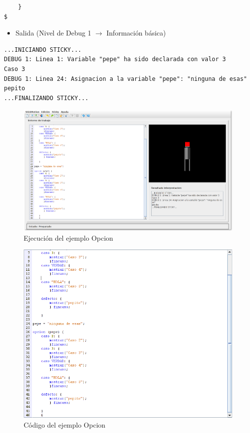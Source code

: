 \documentclass[a4paper, 12pt]{book}
\begin{document}
\begin{itemize}
\begin{verbatim}
    }
$
\end{verbatim}
  
  
  
  \begin{itemize}
\item Salida (Nivel de Debug 1 $\rightarrow$ Información básica)
\end{itemize}
\begin{verbatim}
...INICIANDO STICKY...
DEBUG 1: Linea 1: Variable "pepe" ha sido declarada con valor 3
Caso 3
DEBUG 1: Linea 24: Asignacion a la variable "pepe": "ninguna de esas"
pepito
...FINALIZANDO STICKY...
\end{verbatim}




\begin{figure}[htb]
  \centerline{\includegraphics[width=\textwidth]{./imagenes/opcion.png}}
\caption{Ejecución del ejemplo Opcion}
\end{figure}


\begin{figure}[htb]
  \centerline{\includegraphics[width=\textwidth]{./imagenes/opcion-codigo.png}}
  \caption{Código del ejemplo Opcion}
\end{figure}



\end{itemize}
\end{document}
